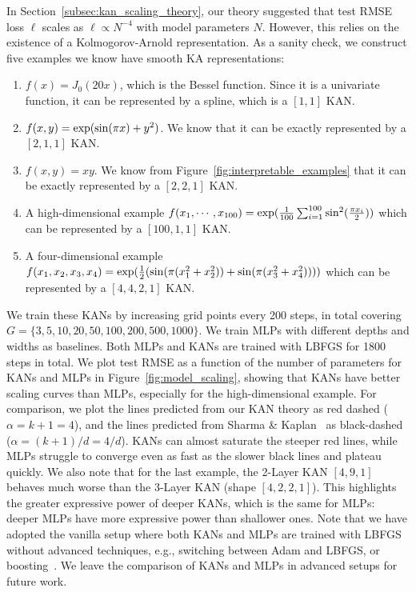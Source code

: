 \documentclass{article}
\numberwithin{equation}{section}
\numberwithin{figure}{section}
\begin{document}
In Section~\ref{subsec:kan_scaling_theory}, our theory suggested that test RMSE loss $\ell$ scales as $\ell\propto N^{-4}$ with model parameters $N$. However, this relies on the existence of a Kolmogorov-Arnold representation. As a sanity check, we construct five examples we know have smooth KA representations: 
\begin{enumerate}[(1)]
    \item $f(x)=J_0(20x)$, which is the Bessel function. Since it is a univariate function, it can be represented by a spline, which is a $[1,1]$ KAN.
    \item $f(x,y)={\rm exp}({\rm sin}(\pi x)+y^2)$. We know that it can be exactly represented by a $[2,1,1]$ KAN.
    \item $f(x,y)=xy$. We know from Figure~\ref{fig:interpretable_examples} that it can be exactly represented by a $[2,2,1]$ KAN. 
    \item  A high-dimensional example $f(x_1,\cdots,x_{100})={\rm exp}(\frac{1}{100}\sum_{i=1}^{100}{\rm sin}^2(\frac{\pi x_i}{2}))$ which can be represented by a $[100,1,1]$ KAN.
    \item A four-dimensional example $f(x_1,x_2,x_3,x_4)={\rm exp}(\frac{1}{2}({\rm sin}(\pi(x_1^2+x_2^2))+{\rm sin}(\pi(x_3^2+x_4^2))))$ which can be represented by a $[4,4,2,1]$ KAN.
\end{enumerate}
We train these KANs by increasing grid points every 200 steps, in total covering $G=\{3,5,10,20,50,100,200,500,1000\}$. We train MLPs with different depths and widths as baselines. Both MLPs and KANs are trained with LBFGS for 1800 steps in total. We plot test RMSE as a function of the number of parameters for KANs and MLPs in Figure~\ref{fig:model_scaling}, showing that KANs have better scaling curves than MLPs, especially for the high-dimensional example. For comparison, we plot the lines predicted from our KAN theory as red dashed ($\alpha=k+1=4$), and the lines predicted from Sharma \& Kaplan~\cite{sharma2020neural} as black-dashed ($\alpha=(k+1)/d=4/d$). KANs can almost saturate the steeper red lines, while MLPs struggle to converge even as fast as the slower black lines and plateau quickly. We also note that for the last example, the 2-Layer KAN $[4,9,1]$ behaves much worse than the 3-Layer KAN (shape $[4,2,2,1]$). This highlights the greater expressive power of deeper KANs, which is the same for MLPs: deeper MLPs have more expressive power than shallower ones. Note that we have adopted the vanilla setup where both KANs and MLPs are trained with LBFGS without advanced techniques, e.g., switching between Adam and LBFGS, or boosting~\cite{wang2024multi}. We leave the comparison of KANs and MLPs in advanced setups for future work.
\end{document}
